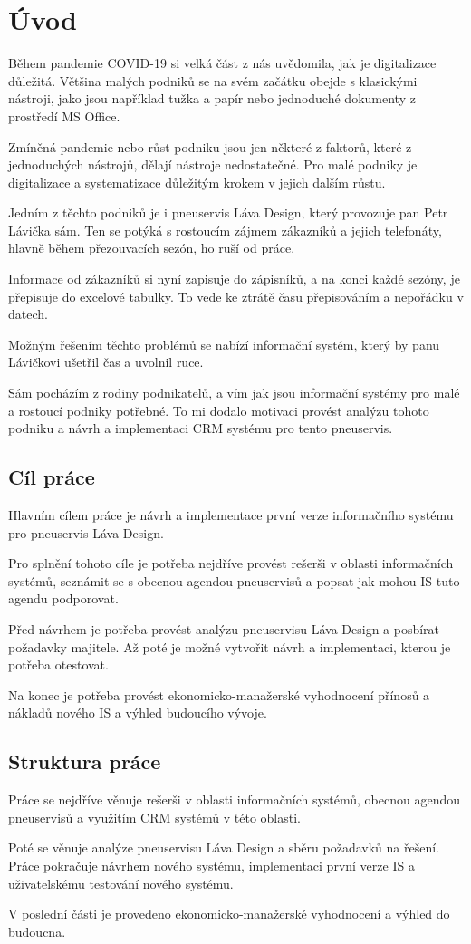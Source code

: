 \chapter{Úvod}
Během pandemie COVID-19 si velká část z nás uvědomila, jak je digitalizace důležitá. Většina malých podniků se na svém začátku obejde s klasickými nástroji, jako jsou například tužka a papír nebo jednoduché dokumenty z prostředí MS Office. 

Zmíněná pandemie nebo růst podniku jsou jen některé z faktorů, které z jednoduchých nástrojů, dělají nástroje nedostatečné. Pro malé podniky je digitalizace a systematizace důležitým krokem v jejich dalším růstu. 

Jedním z těchto podniků je i pneuservis Láva Design, který provozuje pan Petr Lávička sám. Ten se potýká s rostoucím zájmem zákazníků a jejich telefonáty, hlavně během přezouvacích sezón, ho ruší od práce. 

Informace od zákazníků si nyní zapisuje do zápisníků, a na konci každé sezóny, je přepisuje do excelové tabulky. To vede ke ztrátě času přepisováním a nepořádku v datech.

Možným řešením těchto problémů se nabízí informační systém, který by panu Lávičkovi ušetřil čas a uvolnil ruce.

Sám pocházím z rodiny podnikatelů, a vím jak jsou informační systémy pro malé a rostoucí podniky potřebné. To mi dodalo motivaci provést analýzu tohoto podniku a návrh a implementaci CRM systému pro tento pneuservis.
\section{Cíl práce}
Hlavním cílem práce je návrh a implementace první verze informačního systému pro pneuservis Láva Design. 

Pro splnění tohoto cíle je potřeba nejdříve provést rešerši v oblasti informačních systémů, seznámit se s obecnou agendou pneuservisů a popsat jak mohou IS tuto agendu podporovat.

Před návrhem je potřeba provést analýzu pneuservisu Láva Design a posbírat požadavky majitele. Až poté je možné vytvořit návrh a implementaci, kterou je potřeba otestovat.

Na konec je potřeba provést ekonomicko-manažerské vyhodnocení přínosů a nákladů nového IS a výhled budoucího vývoje.
\section{Struktura práce}
Práce se nejdříve věnuje rešerši v oblasti informačních systémů, obecnou agendou pneuservisů a využitím CRM systémů v této oblasti. 

Poté se věnuje analýze pneuservisu Láva Design a sběru požadavků na řešení. Práce pokračuje návrhem nového systému, implementaci první verze IS a uživatelskému testování nového systému. 

V poslední části je provedeno ekonomicko-manažerské vyhodnocení a výhled do budoucna.
